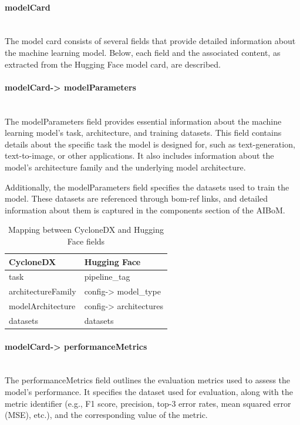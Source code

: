 \documentclass[12pt,a4paper, oneside, openright]{book}
\newcommand{\aibom}{{AIBoM}\xspace}
\begin{document}
\paragraph{modelCard}\mbox{} \\
 The model card consists of several fields that provide detailed information about the machine learning model.
Below, each field and the associated content, as extracted from the Hugging Face model card, are described.
 
\paragraph{modelCard-> modelParameters}\mbox{} \\
The modelParameters field provides essential information about the machine learning model's task, architecture, and training datasets. This field contains details about the specific task the model is designed for, such as text-generation, text-to-image, or other applications. It also includes information about the model's architecture family  and the underlying model architecture.

Additionally, the modelParameters field specifies the datasets used to train the model. These datasets are referenced through bom-ref links, and detailed information about them is captured in the components section of the \aibom. 
\begin{table}[h!]
    \centering
    \begin{tabular}{|p{7cm}|p{6cm}|}
        \hline
        \textbf{CycloneDX} & \textbf{Hugging Face}\\ \hline
            task    
           & pipeline\_tag
        \\ \hline
        architectureFamily   
           & config-> model\_type 
        \\ \hline
         modelArchitecture   
           & config-> architectures 
        \\ \hline
                 datasets   
           &  datasets
        \\ \hline
    \end{tabular}
\caption{Mapping between CycloneDX and Hugging Face fields}
    \label{tab:cyclonedx_huggingface}
\end{table}




\clearpage
\paragraph{modelCard-> performanceMetrics}\mbox{} \\
The performanceMetrics field outlines the evaluation metrics used to assess the model's performance. It specifies the dataset used for evaluation, along with the metric identifier (e.g., F1 score, precision, top-3 error rates, mean squared error (MSE), etc.), and the corresponding value of the metric.
\end{document}
